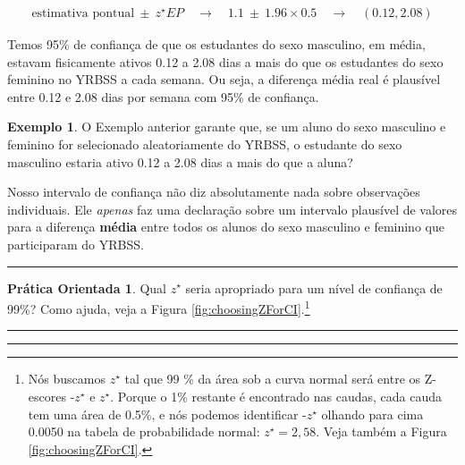 \documentclass[
]{book}
\theoremstyle{definition}
\theoremstyle{definition}
\newtheorem{example}{Exemplo}[chapter]
\theoremstyle{definition}
\newtheorem{exercise}{Prática Orientada}[chapter]
\theoremstyle{definition}
\theoremstyle{remark}
\begin{document}
\begin{eqnarray*}
\text{estimativa pontual}\ \pm\ z^{\star} EP
    \quad\rightarrow\quad 1.1\ \pm\ 1.96\times 0.5
    \quad\rightarrow\quad (0.12, 2.08)
\end{eqnarray*}

Temos 95\% de confiança de que os estudantes do sexo masculino, em média, estavam fisicamente ativos 0.12 a 2.08 dias a mais do que os estudantes do sexo feminino no YRBSS a cada semana. Ou seja, a diferença média real é plausível entre 0.12 e 2.08 dias por semana com 95\% de confiança.

\begin{example}
\protect\hypertarget{exm:unnamed-chunk-181}{}{\label{exm:unnamed-chunk-181} }O Exemplo anterior garante que, se um aluno do sexo masculino e feminino for selecionado aleatoriamente do YRBSS, o estudante do sexo masculino estaria ativo 0.12 a 2.08 dias a mais do que a aluna?
\end{example}

Nosso intervalo de confiança não diz absolutamente nada sobre observações individuais. Ele \emph{apenas} faz uma declaração sobre um intervalo plausível de valores para a diferença \textbf{média} entre todos os alunos do sexo masculino e feminino que participaram do YRBSS.

\begin{center}\rule{0.5\linewidth}{0.5pt}\end{center}

\begin{exercise}
\protect\hypertarget{exr:unnamed-chunk-182}{}{\label{exr:unnamed-chunk-182} }Qual \(z^{\star}\) seria apropriado para um nível de confiança de 99\%? Como ajuda, veja a Figura \ref{fig:choosingZForCI}.\footnote{Nós buscamos \(z^{\star}\) tal que 99 \% da área sob a curva normal será entre os Z-escores -\(z^{\star}\) e \(z^{\star}\). Porque o 1\% restante é encontrado nas caudas, cada cauda tem uma área de 0.5\%, e nós podemos identificar -\(z^{\star}\) olhando para cima 0.0050 na tabela de probabilidade normal: \(z^{\star} = 2,58\). Veja também a Figura \ref{fig:choosingZForCI}.}
\end{exercise}

\begin{center}\rule{0.5\linewidth}{0.5pt}\end{center}

\begin{center}\rule{0.5\linewidth}{0.5pt}\end{center}
\end{document}
